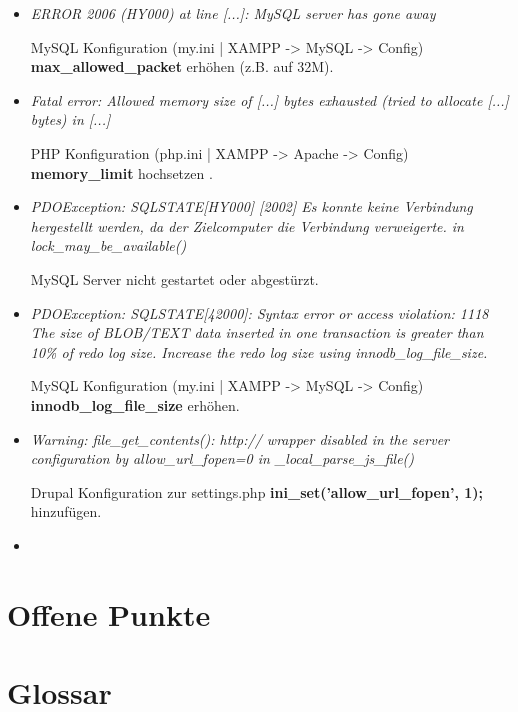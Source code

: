 \begin{itemize}
	\item \textit{ERROR 2006 (HY000) at line [...]: MySQL server has gone away}
	
	MySQL Konfiguration (my.ini | XAMPP -> MySQL -> Config)
	\textbf{max\_allowed\_packet} erhöhen (z.B. auf 32M).
	
	
	\item \textit{Fatal error: Allowed memory size of [...] bytes exhausted (tried to allocate [...] bytes) in [...]}
	
	PHP Konfiguration (php.ini | XAMPP -> Apache -> Config)
	\textbf{memory\_limit} hochsetzen .
	
	
	\item \textit{PDOException: SQLSTATE[HY000] [2002] Es konnte keine Verbindung hergestellt werden, da der Zielcomputer die Verbindung verweigerte. in lock\_may\_be\_available()}
	
	MySQL Server nicht gestartet oder abgestürzt.
	
	
	\item \textit{PDOException: SQLSTATE[42000]: Syntax error or access violation: 1118 The size of BLOB/TEXT data inserted in one transaction is greater than 10\% of redo log size. Increase the redo log size using innodb\_log\_file\_size.}
	
	MySQL Konfiguration (my.ini | XAMPP -> MySQL -> Config)
	\textbf{innodb\_log\_file\_size} erhöhen.
	
	
	\item \textit{Warning: file\_get\_contents(): http:// wrapper disabled in the server configuration by allow\_url\_fopen=0 in \_local\_parse\_js\_file()}
	
	Drupal Konfiguration zur settings.php \textbf{ini\_set('allow\_url\_fopen', 1);} hinzufügen.
	
	
	\item
		
	
\end{itemize}


\section{Offene Punkte}


\section{Glossar}\label{sec:glossary}




\newpage
\printbibliography
%
